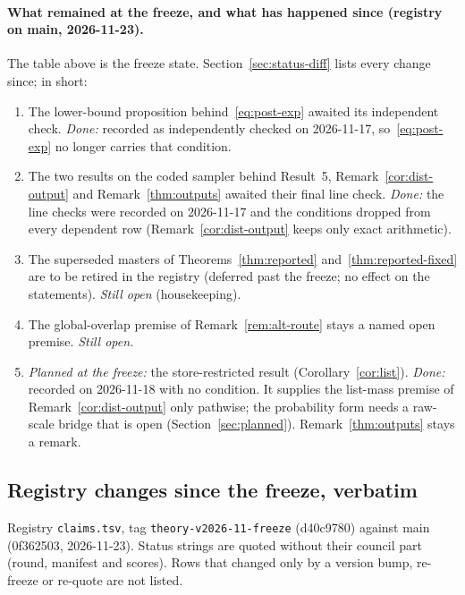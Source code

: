 \paragraph{What remained at the freeze, and what has happened since (registry on main, 2026-11-23).}
The table above is the freeze state. Section~\ref{sec:status-diff} lists every change since; in short:
\begin{enumerate}[leftmargin=1.5em,itemsep=1pt]
  \item The lower-bound proposition behind~\eqref{eq:post-exp} awaited its independent check. \emph{Done:} recorded as
    independently checked on 2026-11-17, so~\eqref{eq:post-exp} no longer carries that condition.
  \item The two results on the coded sampler behind Result~5, Remark~\ref{cor:dist-output} and Remark~\ref{thm:outputs}
    awaited their final line check. \emph{Done:} the line checks were recorded on 2026-11-17 and the conditions dropped
    from every dependent row (Remark~\ref{cor:dist-output} keeps only exact arithmetic).
  \item The superseded masters of Theorems~\ref{thm:reported} and~\ref{thm:reported-fixed} are to be retired in the registry
    (deferred past the freeze; no effect on the statements). \emph{Still open} (housekeeping).
  \item The global-overlap premise of Remark~\ref{rem:alt-route} stays a named open premise. \emph{Still open.}
  \item \emph{Planned at the freeze:} the store-restricted result (Corollary~\ref{cor:list}). \emph{Done:} recorded on
    2026-11-18 with no condition. It supplies the list-mass premise of Remark~\ref{cor:dist-output} only pathwise; the
    probability form needs a raw-scale bridge that is open (Section~\ref{sec:planned}). Remark~\ref{thm:outputs} stays a
    remark.
\end{enumerate}

\subsection*{Registry changes since the freeze, verbatim}\label{app:status-verbatim}
Registry \texttt{claims.tsv}, tag \texttt{theory-v2026-11-freeze} (d40c9780) against main (0f362503, 2026-11-23). Status
strings are quoted without their council part (round, manifest and scores). Rows that changed only by a version bump, re-freeze or re-quote are not listed.

